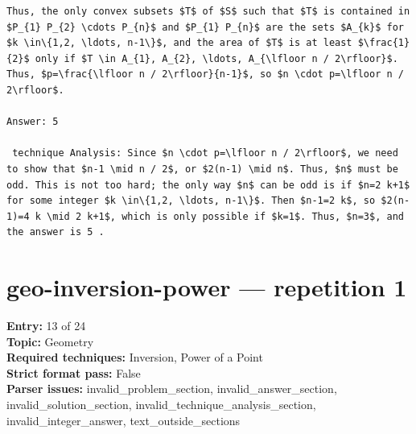 \documentclass[11pt]{article}
\begin{document}
\begin{Verbatim}[breaklines=true,breakanywhere=true,fontsize=\small]
Thus, the only convex subsets $T$ of $S$ such that $T$ is contained in $P_{1} P_{2} \cdots P_{n}$ and $P_{1} P_{n}$ are the sets $A_{k}$ for $k \in\{1,2, \ldots, n-1\}$, and the area of $T$ is at least $\frac{1}{2}$ only if $T \in A_{1}, A_{2}, \ldots, A_{\lfloor n / 2\rfloor}$. Thus, $p=\frac{\lfloor n / 2\rfloor}{n-1}$, so $n \cdot p=\lfloor n / 2\rfloor$.

Answer: 5

 technique Analysis: Since $n \cdot p=\lfloor n / 2\rfloor$, we need to show that $n-1 \mid n / 2$, or $2(n-1) \mid n$. Thus, $n$ must be odd. This is not too hard; the only way $n$ can be odd is if $n=2 k+1$ for some integer $k \in\{1,2, \ldots, n-1\}$. Then $n-1=2 k$, so $2(n-1)=4 k \mid 2 k+1$, which is only possible if $k=1$. Thus, $n=3$, and the answer is 5 .
\end{Verbatim}
\clearpage
\section{geo-inversion-power --- repetition 1}
{\color{metadata}
\textbf{Entry:} 13 of 24\\
\textbf{Topic:} Geometry\\
\textbf{Required techniques:} Inversion, Power of a Point\\
\textbf{Strict format pass:} False\\
\textbf{Parser issues:} invalid\_problem\_section, invalid\_answer\_section, invalid\_solution\_section, invalid\_technique\_analysis\_section, invalid\_integer\_answer, text\_outside\_sections
}
\end{document}
